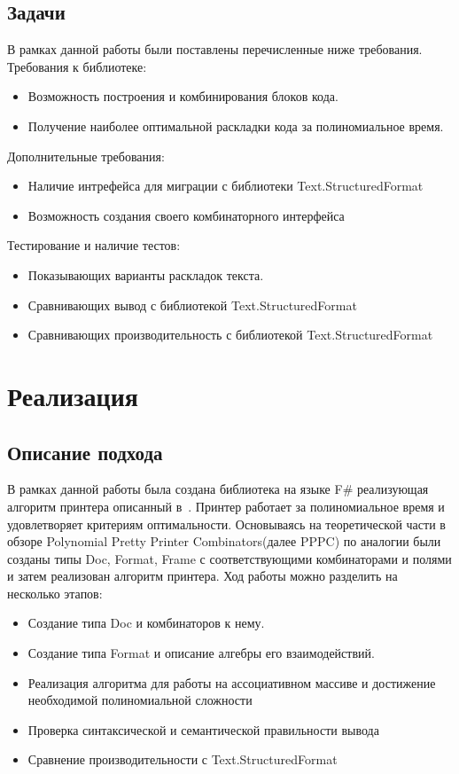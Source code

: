 \documentclass{matmex-diploma}
\begin{document}
\subsection{Задачи }
В рамках данной работы были поставлены перечисленные ниже требования.
Требования к библиотеке:
\begin{itemize}
    \item Возможность построения и комбинирования блоков кода.
    \item Получение наиболее оптимальной раскладки кода за полиномиальное время.
\end{itemize}
Дополнительные требования:
\begin{itemize}
    \item Наличие интрефейса для миграции с библиотеки Text.StructuredFormat
    \item Возможность создания своего комбинаторного интерфейса
\end{itemize} 
Тестирование и наличие тестов:
\begin{itemize}
    \item Показывающих варианты раскладок текста.
    \item Сравнивающих вывод с библиотекой Text.StructuredFormat
    \item Сравнивающих производительность с библиотекой Text.StructuredFormat
\end{itemize} 
\section{Реализация}
\subsection{Описание подхода}
В рамках данной работы была создана библиотека на языке F\# реализующая алгоритм принтера описанный в~\cite{podkopaevD}. Принтер работает за полиномиальное время и удовлетворяет критериям оптимальности.
Основываясь на теоретической части в обзоре Polynomial Pretty Printer Combinators(далее PPPC) по аналогии были созданы типы Doc, Format, Frame с соответствующими комбинаторами и полями и затем реализован алгоритм принтера. 
Ход работы можно разделить на несколько этапов:
\begin{itemize}
    \item Создание типа Doc и комбинаторов к нему.
    \item Создание типа Format и описание алгебры его взаимодействий.
    \item Реализация алгоритма для работы на ассоциативном массиве и достижение необходимой полиномиальной сложности
    \item Проверка синтаксической и семантической правильности вывода
    \item Сравнение производительности с Text.StructuredFormat
\end{itemize}
\end{document}
